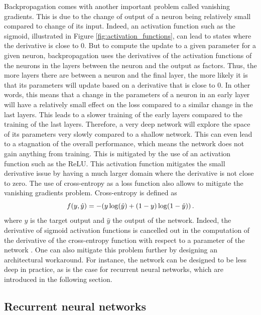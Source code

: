 Backpropagation comes with another important problem called vanishing gradients. This is due to the change of output of a neuron being relatively small compared to change of its input. Indeed, an activation function such as the sigmoid, illustrated in Figure \ref{fig:activation_functions}, can lead to states where the derivative is close to 0. But to compute the update to a given parameter for a given neuron, backpropagation uses the derivatives of the activation functions of the neurons in the layers between the neuron and the output as factors. Thus, the more layers there are between a neuron and the final layer, the more likely it is that its parameters will update based on a derivative that is close to 0. In other words, this means that a change in the parameters of a neuron in an early layer will have a relatively small effect on the loss compared to a similar change in the last layers. This leads to a slower training of the early layers compared to the training of the last layers. Therefore, a very deep network will explore the space of its parameters very slowly compared to a shallow network. This can even lead to a stagnation of the overall performance, which means the network does not gain anything from training. This is mitigated by the use of an activation function such as the ReLU. This activation function mitigates the small derivative issue by having a much larger domain where the derivative is not close to zero. The use of cross-entropy as a loss function also allows to mitigate the vanishing gradients problem. Cross-entropy is defined as 
\begin{equation}
    f(y,\hat{y}) = -(y\,\mathrm{log}(\hat{y}) + (1-y)\,\mathrm{log}(1-\hat{y})) \mend
\end{equation}
where $y$ is the target output and $\hat{y}$ the output of the network. Indeed, the derivative of sigmoid activation functions is cancelled out in the computation of the derivative of the cross-entropy function with respect to a parameter of the network \cite{NN_book}. One can also mitigate this problem further by designing an architectural workaround. For instance, the network can be designed to be less deep in practice, as is the case for recurrent neural networks, which are introduced in the following section.

\subsection{Recurrent neural networks}

